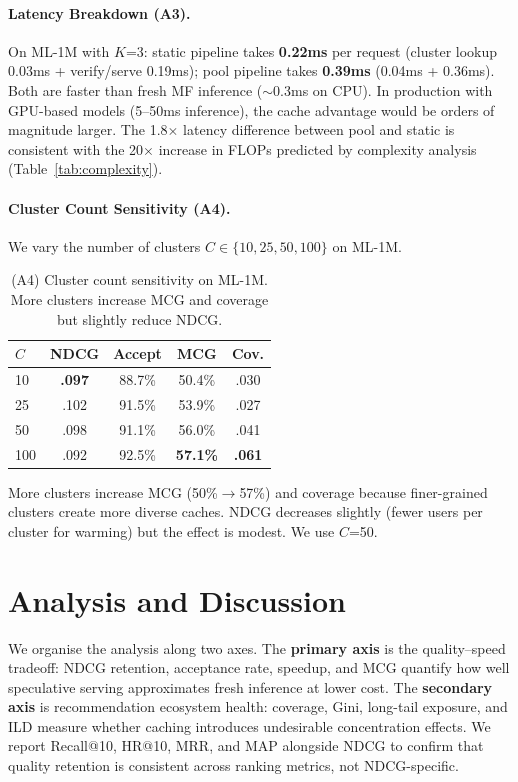 \documentclass[sigconf,nonacm=false]{acmart}
\begin{document}
\paragraph{Latency Breakdown (A3).}
On ML-1M with $K$=3: static pipeline takes \textbf{0.22ms} per request (cluster lookup 0.03ms + verify/serve 0.19ms); pool pipeline takes \textbf{0.39ms} (0.04ms + 0.36ms). Both are faster than fresh MF inference ($\sim$0.3ms on CPU). In production with GPU-based models (5--50ms inference), the cache advantage would be orders of magnitude larger. The 1.8$\times$ latency difference between pool and static is consistent with the 20$\times$ increase in FLOPs predicted by complexity analysis (Table~\ref{tab:complexity}).

\paragraph{Cluster Count Sensitivity (A4).}
We vary the number of clusters $C \in \{10, 25, 50, 100\}$ on ML-1M.

\begin{table}[t]
\centering
\caption{(A4) Cluster count sensitivity on ML-1M. More clusters increase MCG and coverage but slightly reduce NDCG.}
\label{tab:a4}
\small
\begin{tabular}{lcccc}
\toprule
$C$ & NDCG & Accept & MCG & Cov. \\
\midrule
10 & \textbf{.097} & 88.7\% & 50.4\% & .030 \\
25 & .102 & 91.5\% & 53.9\% & .027 \\
\rowcolor{gray!15}
50 & .098 & 91.1\% & 56.0\% & .041 \\
100 & .092 & 92.5\% & \textbf{57.1\%} & \textbf{.061} \\
\bottomrule
\end{tabular}
\end{table}

More clusters increase MCG (50\%${}\to{}$57\%) and coverage because finer-grained clusters create more diverse caches. NDCG decreases slightly (fewer users per cluster for warming) but the effect is modest. We use $C$=50.

\section{Analysis and Discussion}

We organise the analysis along two axes. The \textbf{primary axis} is the quality--speed tradeoff: NDCG retention, acceptance rate, speedup, and MCG quantify how well speculative serving approximates fresh inference at lower cost. The \textbf{secondary axis} is recommendation ecosystem health: coverage, Gini, long-tail exposure, and ILD measure whether caching introduces undesirable concentration effects. We report Recall@10, HR@10, MRR, and MAP alongside NDCG to confirm that quality retention is consistent across ranking metrics, not NDCG-specific.
\end{document}
